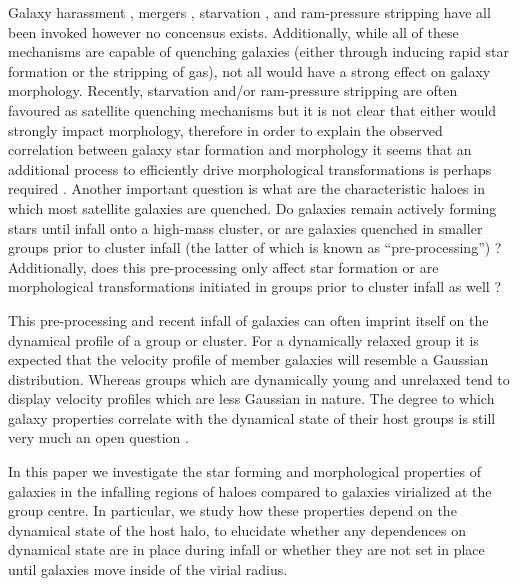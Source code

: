 \documentclass[a4paper,fleqn,usenatbib]{mnras}
\begin{document}
Galaxy harassment \citep[e.g.][]{moore1996}, mergers \citep[e.g.][]{mihos1994},
starvation \citep[e.g.][]{kawata2008}, and ram-pressure stripping
\citep[e.g.][]{gunn1972} have all been invoked however no concensus
exists.  Additionally, while all of these mechanisms are capable of
quenching galaxies (either through inducing rapid star formation or
the stripping of gas), not all would have a strong effect on galaxy
morphology.  Recently, starvation and/or ram-pressure stripping are
often favoured
as satellite quenching mechanisms \citep{muzzin2014, peng2015, fillingham2015,
  weisz2015, wetzel2015} but it is not clear that either
would strongly impact morphology, therefore in order to explain the
observed correlation between galaxy star formation and morphology it
seems that an additional process to efficiently drive morphological
transformations is perhaps required \citep[e.g.][]{christlein2004}.
Another important question is what are
the characteristic haloes in which most satellite galaxies are
quenched.  Do galaxies remain actively forming stars until infall onto
a high-mass cluster, or are galaxies quenched in smaller groups prior
to cluster infall (the latter of which is known as
``pre-processing'') \citep{fujita2004, mcgee2009, cybulski2014,
  hou2014, haines2015, just2015}?  Additionally, does this pre-processing only
affect star formation or are morphological transformations initiated
in groups prior to cluster infall as well \citep{kodama2001, moran2007}? 
\par
This pre-processing and recent infall of galaxies can often imprint
itself on the dynamical profile of a group or cluster.  For a
dynamically relaxed group it is expected that the velocity profile of member
galaxies will resemble a Gaussian distribution.  Whereas groups which
are dynamically young and unrelaxed tend to display velocity
profiles which are less Gaussian in nature.  The degree to which
galaxy properties correlate with the dynamical state of their host
groups is still very much an open question \citep{biviano2002,
  ribeiro2010, hou2013, ribeiro2013, ribeiro2013b}.
\par
In this paper we investigate the star forming and
morphological properties of galaxies in the infalling regions of haloes
compared to
galaxies virialized at the group centre.  In particular, we study how
these properties depend on the dynamical state of the host halo, to
elucidate whether any dependences on dynamical state are in place during
infall or whether they are not set in place until galaxies move inside
of the virial radius.
\end{document}
